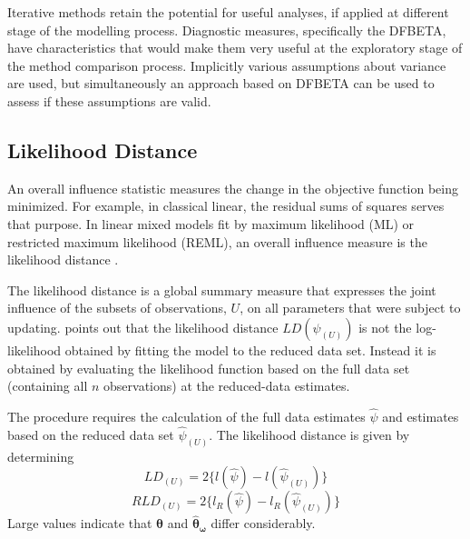 \documentclass[12pt, a4paper]{report}
\theoremstyle{plain}
\theoremstyle{definition}
\theoremstyle{remark}
\begin{document}
	
	Iterative methods retain the potential for useful analyses, if applied at different stage of the modelling process. Diagnostic measures, specifically the DFBETA, have characteristics that would make them very useful at the exploratory stage of the method comparison process. Implicitly various assumptions about variance are used, but simultaneously an approach based on DFBETA can be used to assess if these assumptions are valid.
	
	
	
	\subsection{Likelihood Distance}
	An overall influence statistic measures the change in the objective function being minimized. For example, in
	classical linear, the residual sums of squares serves that purpose. In linear mixed models fit by
	 maximum likelihood (ML) or  restricted maximum likelihood (REML), an overall influence measure is the  likelihood distance \citep{CookWeisberg}.
	
	
	The  likelihood distance is a global summary measure that expresses the joint influence of the subsets of observations, $U$, on all parameters that were subject to updating. \citet{schabenberger} points out that the likelihood distance $LD(\psi_{(U)})$ is not the log-likelihood obtained by fitting the model to the reduced data set. Instead it is obtained by evaluating the likelihood function based on the full data set (containing all $n$ observations) at the reduced-data estimates.
	
	
	
	
	
	The
	procedure requires the calculation of the full data estimates
	$\hat{\psi}$ and estimates based on the reduced data set
	$\hat{\psi}_{(U)}$. The likelihood distance is given by
	determining
	\[
	LD_{(U)} = 2\{l(\hat{\psi}) - l( \hat{\psi}_{(U)}) \}\]\[
	RLD_{(U)} = 2\{l_{R}(\hat{\psi}) - l_{R}(\hat{\psi}_{(U)})\}
	\]
	Large values indicate that $\boldsymbol{\hat{\theta}}$ and $\boldsymbol{\hat{\theta}_\omega}$ differ considerably.
	
\end{document}
